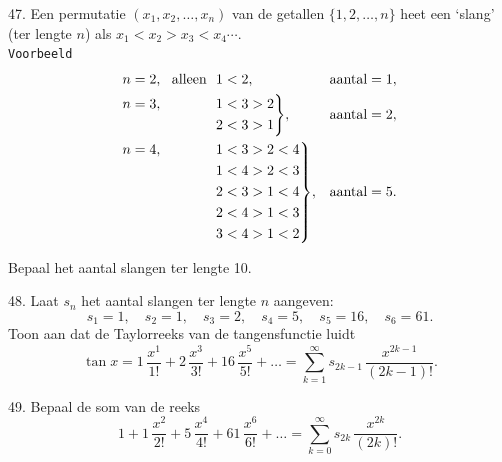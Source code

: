 \clearpage

\begin{problem}{47.}
	Een permutatie $(x_1,x_2,\dotsc,x_n)$ van de getallen $\{1,2,\dotsc,n\}$ heet een `slang' (ter lengte $n$) als $x_1 < x_2 > x_3 < x_4 \dotsb$.\\

\noindent \texttt{Voorbeeld}
	\begin{equation*}
	\begin{aligned}[t]
	&\begin{aligned}[t] n=2, \text{\ \ alleen\ \ } 1<2, \end{aligned} && \text{aantal} = 1, \\
	&\hskip-\nulldelimiterspace\mathord{\left. \begin{aligned} n=3, \hphantom{\text{\ \ alleen\ \ }} 1&<3>2 \\
	2&<3>1 \end{aligned} \right\}}, && \text{aantal} = 2, \\
	&\hskip-\nulldelimiterspace\mathord{\left. \begin{aligned} n=4, \hphantom{\text{\ \ alleen\ \ }} 1&<3>2<4 \\
	1&<4>2<3 \\
	2&<3>1<4 \\
	2&<4>1<3 \\
	3&<4>1<2 \end{aligned} \right\}},
	&& \text{aantal} = 5. \\
	\end{aligned}
	\end{equation*}

	Bepaal het aantal slangen ter lengte 10.
\end{problem}

\begin{problem}{48.}
	Laat $s_n$ het aantal slangen ter lengte $n$ aangeven:
	\begin{equation*}
		s_1 = 1, \quad s_2 = 1, \quad s_3 = 2, \quad s_4 = 5, \quad s_5 = 16, \quad s_6 = 61.
	\end{equation*}
	Toon aan dat de Taylorreeks van de tangensfunctie luidt
	\begin{equation*}
		\tan x = 1\, \frac{x^1}{1!} + 2\, \frac{x^3}{3!} + 16\, \frac{x^5}{5!} + \dots = \textstyle\sum\limits_{k=1}^{\infty} s_{2k - 1}\, \frac{x^{2k - 1}}{(2k - 1)!}.
	\end{equation*}
\end{problem}

\begin{problem}{49.}
	Bepaal de som van de reeks
	\begin{equation*}
		1 + 1\, \frac{x^2}{2!} + 5\, \frac{x^4}{4!} + 61\, \frac{x^6}{6!} + \dots = \textstyle\sum\limits_{k=0}^{\infty} s_{2k}\, \frac{x^{2k}}{(2k)!}.
	\end{equation*}
\end{problem}

